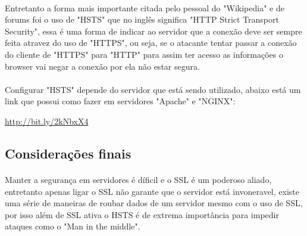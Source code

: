 \documentclass{article}
\begin{document}
  \paragraph{}
  Entretanto a forma mais importante citada pelo
  pessoal do "Wikipedia" e de forums foi o uso de "HSTS" que no inglês significa
  "HTTP Strict Transport Security", essa é uma forma de indicar ao servidor
  que a conexão deve ser sempre feita atravez do uso de "HTTPS", ou seja, se o
  atacante tentar passar a conexão do cliente de "HTTPS" para "HTTP" para assim
  ter acesso as informações o browser vai negar a conexão por ela não estar
  segura.
  \paragraph{}
  Configurar "HSTS" depende do servidor que está sendo utilizado, abaixo está
  um link que possui como fazer em servidores "Apache" e "NGINX":

  \url{http://bit.ly/2kNbxX4}

  \subsection{Considerações finais}
  \paragraph{}
  Manter a segurança em servidores é díficil e o SSL é um poderoso aliado,
  entretanto apenas ligar o SSL não garante que o servidor está invoneravel,
  existe uma série de maneiras de roubar dados de um servidor mesmo com o uso
  de SSL, por isso além de SSL ativa o HSTS é de extrema importância para
  impedir ataques como o "Man in the middle".
\end{document}
